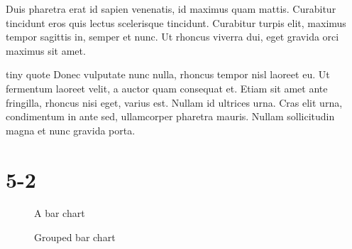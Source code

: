 \documentclass{scrartcl}
\begin{document}
Duis pharetra erat id sapien venenatis, id maximus quam mattis. Curabitur tincidunt eros quis lectus scelerisque tincidunt. Curabitur turpis elit, maximus tempor sagittis in, semper et nunc. Ut rhoncus viverra dui, eget gravida orci maximus sit amet.
\begin{tinyitalicsquote}
 tiny quote 
  Donec vulputate nunc nulla, rhoncus tempor nisl laoreet eu. Ut fermentum laoreet velit, a auctor quam consequat et. Etiam sit amet ante fringilla, rhoncus nisi eget, varius est. Nullam id ultrices urna. Cras elit urna, condimentum in ante sed, ullamcorper pharetra mauris. Nullam sollicitudin magna et nunc gravida porta. 

\end{tinyitalicsquote}

\section{5-2}
\begin{figure}
\centering 
  \caption{A bar chart}
\end{figure}

\begin{figure}
\centering
  \caption{Grouped bar chart}  
\end{figure}
\end{document}
